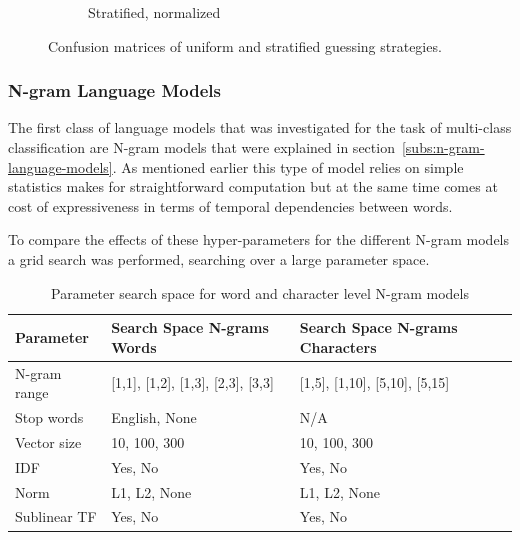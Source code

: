 \begin{figure}[h]
\begin{subfigure}[b]{0.48\textwidth}
        \caption{Stratified, normalized}
        \label{fig:exp-vector-space-conf-matrix-guessing-stratified-normalized}
    \end{subfigure}
    \caption{Confusion matrices of uniform and stratified guessing strategies. }
  \label{fig:exp-vector-space-conf-matrix-guessing}
\end{figure}

\subsubsection{N-gram Language Models}

The first class of language models that was investigated for the task of multi-class classification are N-gram models that were explained in section~\ref{subs:n-gram-language-models}. As mentioned earlier this type of model relies on simple statistics makes for straightforward computation but at the same time comes at cost of expressiveness in terms of temporal dependencies between words.


 To compare the effects of these hyper-parameters for the different N-gram models a grid search was performed, searching over a large parameter space.

\begin{center}
  \begin{table}[h]
  \begin{tabular}{ l l l}
    \hline
    Parameter & Search Space N-grams Words & Search Space N-grams Characters \\
    \hline
    N-gram range & [1,1], [1,2], [1,3], [2,3], [3,3] & [1,5], [1,10], [5,10], [5,15] \\
    Stop words & English, None & N/A \\
    Vector size & 10, 100, 300 & 10, 100, 300 \\
    IDF & Yes, No & Yes, No \\
    Norm & L1, L2, None & L1, L2, None \\
    Sublinear TF & Yes, No & Yes, No \\
    \hline
  \end{tabular}
  \caption{Parameter search space for word and character level N-gram models}
\label{table:name}
  \end{table}
\end{center}







